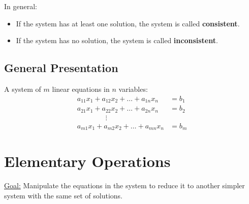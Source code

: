 \documentclass[20pt,a4paper]{extarticle}
\begin{document}
In general:
	\begin{itemize}
		\item If the system has at least one solution, the system is called \textbf{consistent}.
		\item If the system has no solution, the system is called \textbf{inconsistent}.
	\end{itemize}

\subsection*{General Presentation}
A system of $m$ linear equations in $n$ variables:
\begin{align*}
	a_{11} x_1 + a_{12} x_2 + \ldots + a_{1n} x_n &= b_1 \\ 
	a_{21} x_1 + a_{22} x_2 + \ldots + a_{2n} x_n &= b_2 \\ 
	\qquad \qquad \vdots \qquad \qquad & \\ 
	a_{m1} x_1 + a_{m2} x_2 + \ldots + a_{mn} x_n &= b_m
\end{align*}

\newpage

\section{Elementary Operations}

\underline{Goal:} Manipulate the equations in the system to reduce it to another simpler system with the same set of solutions.
\end{document}
